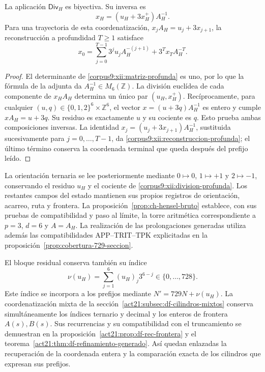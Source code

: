 \begin{proposition}
\label{corpus9:xii:inversion-profunda}
La aplicación \(\mathsf{Div}_H\) es biyectiva. Su inversa es
\begin{equation}
 x_H=(u_H+3x_H^+)A_H^{-1}.
 \label{corpus9:xii:inversa-profunda}
\end{equation}
Para una trayectoria de esta coordenatización,
\(x_jA_H=u_j+3x_{j+1}\), la reconstrucción a profundidad
\(T\geq1\) satisface
\begin{equation}
 x_0=\sum_{j=0}^{T-1}3^ju_jA_H^{-(j+1)}
                 +3^Tx_TA_H^{-T}.
 \label{corpus9:xii:reconstruccion-profunda}
\end{equation}
\end{proposition}
\begin{proof}
El determinante de \eqref{corpus9:xii:matriz-profunda} es uno, por lo
que la fórmula de la adjunta da \(A_H^{-1}\in M_6(\mathbb Z)\).
La división euclídea de cada componente de \(x_HA_H\) determina un
único par \((u_H,x_H^+)\). Recíprocamente, para cualquier
\((u,q)\in\{0,1,2\}^6\times\mathbb Z^6\), el vector
\(x=(u+3q)A_H^{-1}\) es entero y cumple \(xA_H=u+3q\).
Su residuo es exactamente \(u\) y su cociente es \(q\). Esto prueba
ambas composiciones inversas. La identidad
\(x_j=(u_j+3x_{j+1})A_H^{-1}\), sustituida sucesivamente para
\(j=0,\ldots,T-1\), da
\eqref{corpus9:xii:reconstruccion-profunda}; el último término conserva
la coordenada terminal que queda después del prefijo leído.
\end{proof}

La orientación ternaria se lee posteriormente mediante
\(0\mapsto0\), \(1\mapsto+1\) y \(2\mapsto-1\), conservando
el residuo \(u_H\) y el cociente de
\eqref{corpus9:xii:division-profunda}. Los restantes campos del estado
mantienen sus propios registros de orientación, acarreo, ruta y frontera.
La proposición~\ref{prop:ch-hensel-bruto} establece, con sus pruebas de
compatibilidad y paso al límite, la torre aritmética correspondiente a
\(p=3\), \(d=6\) y \(A=A_H\). La realización de las prolongaciones
generadas utiliza además las compatibilidades APP--TRIT--TPK explicitadas
en la proposición~\ref{prop:cobertura-729-seccion}.

El bloque residual conserva también su índice
\[
 \nu(u_H)=\sum_{j=1}^{6}(u_H)_j3^{6-j}\in\{0,\ldots,728\}.
\]
Este índice se incorpora a los prefijos mediante
\(N'=729N+\nu(u_H)\). La coordenatización mixta de la
sección~\ref{act21:subsec:df-cilindros-mixtos} conserva simultáneamente
los índices ternario y decimal y los enteros de frontera
\(A(s),B(s)\). Sus recurrencias y su compatibilidad con el truncamiento
se demuestran en la proposición~\ref{act21:prop:df-rec-frontera} y el
teorema~\ref{act21:thm:df-refinamiento-generado}. Así quedan enlazadas la
recuperación de la coordenada entera y la comparación exacta de los
cilindros que expresan sus prefijos.
